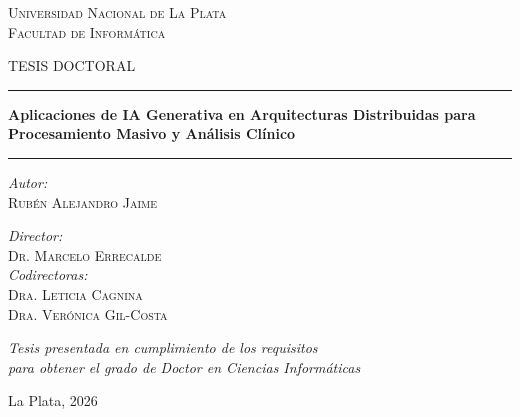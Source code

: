\documentclass[12pt,a4paper,twoside]{book}
\begin{document}
\begin{titlepage}
\centering
\vspace*{1cm}

{\Large\scshape Universidad Nacional de La Plata\\[0.3cm]
Facultad de Informática\par}

\vspace{2cm}

{\Large TESIS DOCTORAL\par}

\vspace{0.5cm}
\rule{\textwidth}{1.5pt}
\vspace{0.5cm}

{\LARGE\bfseries\color{azulunlp} Aplicaciones de IA Generativa en Arquitecturas Distribuidas para Procesamiento Masivo y Análisis Clínico\par}

\vspace{0.5cm}
\rule{\textwidth}{1.5pt}

\vspace{2cm}

\begin{minipage}[t]{0.45\textwidth}
\raggedright
\textit{Autor:}\\[0.2cm]
\textsc{Rubén Alejandro Jaime}
\end{minipage}
\hfill
\begin{minipage}[t]{0.45\textwidth}
\raggedleft
\textit{Director:}\\[0.2cm]
\textsc{Dr. Marcelo Errecalde}\\[0.5cm]
\textit{Codirectoras:}\\[0.2cm]
\textsc{Dra. Leticia Cagnina}\\
\textsc{Dra. Verónica Gil-Costa}
\end{minipage}

\vspace{2cm}

\textit{Tesis presentada en cumplimiento de los requisitos\\
para obtener el grado de Doctor en Ciencias Informáticas}

\vfill

{\large La Plata, 2026\par}
\end{titlepage}

\frontmatter
\end{document}

